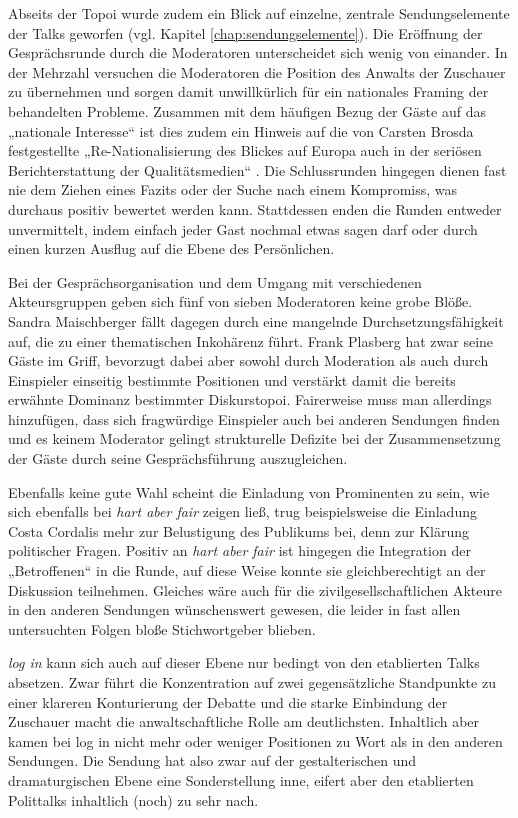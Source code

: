 Abseits der Topoi wurde zudem ein Blick auf einzelne, zentrale Sendungselemente der Talks geworfen (vgl. Kapitel \vref{chap:sendungselemente}). Die Eröffnung der Gesprächsrunde durch die Moderatoren unterscheidet sich wenig von einander. In der Mehrzahl versuchen die Moderatoren die Position des Anwalts der Zuschauer zu übernehmen und sorgen damit unwillkürlich für ein nationales Framing der behandelten Probleme. Zusammen mit dem häufigen Bezug der Gäste auf das „nationale Interesse“ ist dies zudem ein Hinweis auf die von Carsten Brosda festgestellte „Re-Nationalisierung des Blickes auf Europa auch in der seriösen Berichterstattung der Qualitätsmedien“ \parencite{siniawskiSchuldenbergeHilfspaketeUnd2012}. Die Schlussrunden hingegen dienen fast nie dem Ziehen eines Fazits oder der Suche nach einem Kompromiss, was durchaus positiv bewertet werden kann. Stattdessen enden die Runden entweder unvermittelt, indem einfach jeder Gast nochmal etwas sagen darf oder durch einen kurzen Ausflug auf die Ebene des Persönlichen.

Bei der Gesprächsorganisation und dem Umgang mit verschiedenen Akteursgruppen geben sich fünf von sieben Moderatoren keine grobe Blöße. Sandra Maischberger fällt dagegen durch eine mangelnde Durchsetzungsfähigkeit auf, die zu einer thematischen Inkohärenz führt. Frank Plasberg hat zwar seine Gäste im Griff, bevorzugt dabei aber sowohl durch Moderation als auch durch Einspieler einseitig bestimmte Positionen und verstärkt damit die bereits erwähnte Dominanz bestimmter Diskurstopoi. Fairerweise muss man allerdings hinzufügen, dass sich fragwürdige Einspieler auch bei anderen Sendungen finden und es keinem Moderator gelingt strukturelle Defizite bei der Zusammensetzung der Gäste durch seine Gesprächsführung auszugleichen.

Ebenfalls keine gute Wahl scheint die Einladung von Prominenten zu sein, wie sich ebenfalls bei \textit{hart aber fair} zeigen ließ, trug beispielsweise die Einladung Costa Cordalis mehr zur Belustigung des Publikums bei, denn zur Klärung politischer Fragen. Positiv an \textit{hart aber fair} ist hingegen die Integration der „Betroffenen“ in die Runde, auf diese Weise konnte sie gleichberechtigt an der Diskussion teilnehmen. Gleiches wäre auch für die zivilgesellschaftlichen Akteure in den anderen Sendungen wünschenswert gewesen, die leider in fast allen untersuchten Folgen bloße Stichwortgeber blieben.

\textit{log in} kann sich auch auf dieser Ebene nur bedingt von den etablierten Talks absetzen. Zwar führt die Konzentration auf zwei gegensätzliche Standpunkte zu einer klareren Konturierung der Debatte und die starke Einbindung der Zuschauer macht die anwaltschaftliche Rolle am deutlichsten. Inhaltlich aber kamen bei log in nicht mehr oder weniger Positionen zu Wort als in den anderen Sendungen. Die Sendung hat also zwar auf der gestalterischen und dramaturgischen Ebene eine Sonderstellung inne, eifert aber den etablierten Polittalks inhaltlich (noch) zu sehr nach.


